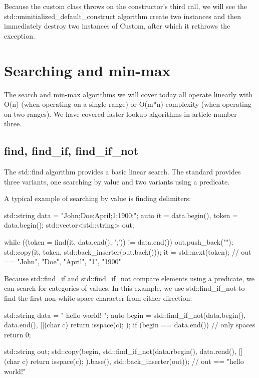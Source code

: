 Because the custom class throws on the constructor’s third call, we will see the std::uninitialized\_default\_construct algorithm create two instances and then immediately destroy two instances of Custom, after which it rethrows the exception.

\section{Searching and min-max}

The search and min-max algorithms we will cover today all operate linearly with O(n) (when operating on a single range) or O(m*n) complexity (when operating on two ranges). We have covered faster lookup algorithms in article number three.

\subsection{find, find\_if, find\_if\_not}

The std::find algorithm provides a basic linear search. The standard provides three variants, one searching by value and two variants using a predicate.



A typical example of searching by value is finding delimiters:

\begin{box-note}
\begin{cppcode}
std::string data = "John;Doe;April;1;1900;";
auto it = data.begin(), token = data.begin();
std::vector<std::string> out;

while ((token = find(it, data.end(), ';')) != data.end()) {
    out.push_back("");
    std::copy(it, token, std::back_inserter(out.back()));
    it = std::next(token);
}
// out == { "John", "Doe", "April", "1", "1900" }
\end{cppcode}
\end{box-note}

Because std::find\_if and std::find\_if\_not compare elements using a predicate, we can search for categories of values. In this example, we use std::find\_if\_not to find the first non-white-space character from either direction:

\begin{box-note}
\begin{cppcode}
std::string data = "   hello world!  ";
auto begin = std::find_if_not(data.begin(), data.end(), 
                              [](char c) { return isspace(c); });
if (begin == data.end()) // only spaces
    return 0;

std::string out;
std::copy(begin, std::find_if_not(data.rbegin(), data.rend(), 
                                  [](char c) { return isspace(c); }).base(), 
          std::back_inserter(out));
// out == "hello world!"
\end{cppcode}
\end{box-note}

